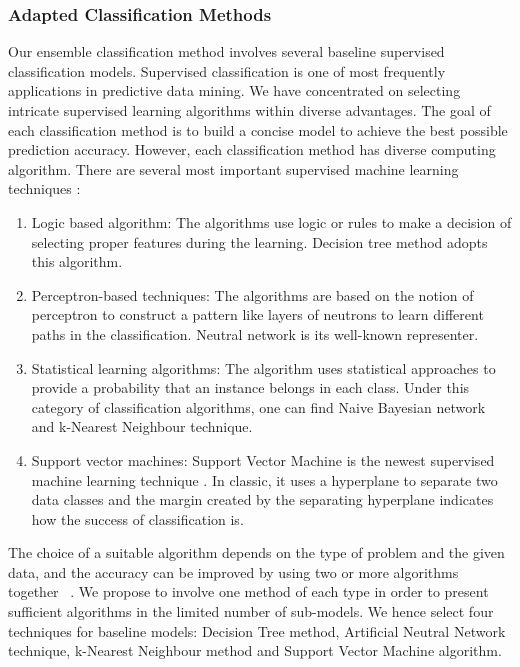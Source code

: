 \documentclass[10pt,journal,compsoc]{IEEEtran}
\begin{document}
\subsubsection{Adapted Classification Methods}
Our ensemble classification method involves several baseline supervised classification models. Supervised classification is one of most frequently applications in predictive data mining. We have concentrated on selecting intricate supervised learning algorithms within diverse advantages. The goal of each classification method is to build a concise model to achieve the best possible prediction accuracy. However, each classification method has diverse computing algorithm. There are several most important supervised machine learning techniques \cite{Kotsiantis}:\\
\begin{enumerate}[label=\alph*)]
	\item Logic based algorithm: The algorithms use logic or rules to make a decision of selecting proper features during the learning. Decision tree method adopts this algorithm.
	\item Perceptron-based techniques: The algorithms are based on the notion of perceptron to construct a pattern like layers of neutrons to learn different paths in the classification. Neutral network is its well-known representer.
	\item Statistical learning algorithms: The algorithm uses statistical approaches to provide a probability that an instance belongs in each class. Under this category of classification algorithms, one can find Naive Bayesian network and k-Nearest Neighbour technique.
	\item Support vector machines: Support Vector Machine is the newest supervised machine learning technique \cite{Kotsiantis}. In classic, it uses a hyperplane to separate two data classes and the margin created by the separating hyperplane indicates how the success of classification is. 
\end{enumerate}

The choice of a suitable algorithm depends on the type of problem and the given data, and the accuracy can be improved by using two or more algorithms together ~\cite{Choudhary}. We propose to involve one method of each type in order to present sufficient algorithms in the limited number of sub-models. We hence select four techniques for baseline models: Decision Tree method, Artificial Neutral Network technique, k-Nearest Neighbour method and Support Vector Machine algorithm.
%
%
\end{document}
